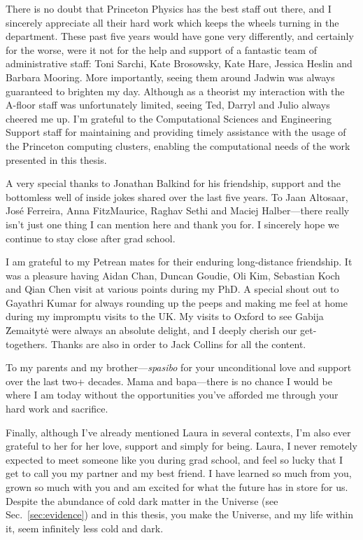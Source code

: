 There is no doubt that Princeton Physics has the best staff out there, and I sincerely appreciate all their hard work which keeps the wheels turning in the department. These  past five years would have gone very differently, and certainly for the worse, were it not for the help and support of a fantastic team of administrative staff: Toni Sarchi, Kate Brosowsky, Kate Hare, Jessica Heslin and Barbara Mooring. More importantly, seeing them around Jadwin was always guaranteed to brighten my day. 
Although as a theorist my interaction with the A-floor staff was unfortunately limited, seeing Ted, Darryl and Julio always cheered me up. I'm grateful to the Computational Sciences and Engineering Support staff for maintaining and providing timely assistance with the usage of the Princeton computing clusters, enabling the computational needs of the work presented in this thesis.

A very special thanks to Jonathan Balkind for his friendship, support and the bottomless well of inside jokes shared over the last five years. To Jaan Altosaar, Jos\'e Ferreira, Anna FitzMaurice, Raghav Sethi and Maciej Halber---there really isn't just one thing I can mention here and thank you for. I sincerely hope we continue to stay close after grad school.

I am grateful to my Petrean mates for their enduring long-distance friendship. It was a pleasure having Aidan Chan, Duncan Goudie, Oli Kim, Sebastian Koch and Qian Chen visit at various points during my PhD. A special shout out to Gayathri Kumar for always rounding up the peeps and making me feel at home during my impromptu visits to the UK. My visits to Oxford to see Gabija \u{Z}emaityt\.{e} were always an absolute delight, and I deeply cherish our get-togethers. Thanks are also in order to Jack Collins for all the content.

To my parents and my brother---\emph{spasibo} for your unconditional love and support over the last two+ decades. Mama and bapa---there is no chance I would be where I am today without the opportunities you've afforded me through your hard work and sacrifice.

Finally, although I've already mentioned Laura in several contexts, I'm also ever grateful to her for her love, support and simply for being. Laura, I never remotely expected to meet someone like you during grad school, and feel so lucky that I get to call you my partner and my best friend. I have learned so much from you, grown so much with you and am excited for what the future has in store for us. Despite the abundance of cold dark matter in the Universe (see Sec.~\ref{sec:evidence}) and in this thesis, you make the Universe, and my life within it, seem infinitely less cold and dark.

\sectionline

